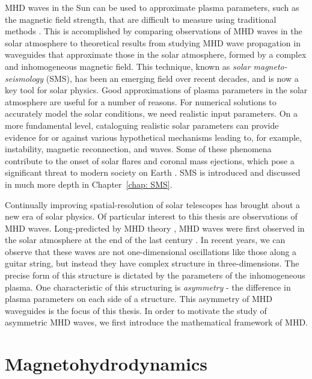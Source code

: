 MHD waves in the Sun can be used to approximate plasma parameters, such as the magnetic field strength, that are difficult to measure using traditional methods \citep{nak_etal05,dem_etal12}. This is accomplished by comparing observations of MHD waves in the solar atmosphere to theoretical results from studying MHD wave propagation in waveguides that approximate those in the solar atmosphere, formed by a complex and inhomogeneous magnetic field. This technique, known as \textit{solar magneto-seismology} (SMS), has been an emerging field over recent decades, and is now a key tool for solar physics. Good approximations of plasma parameters in the solar atmosphere are useful for a number of reasons. For numerical solutions to accurately model the solar conditions, we need realistic input parameters. On a more fundamental level, cataloguing realistic solar parameters can provide evidence for or against various hypothetical mechanisms leading to, for example, instability, magnetic reconnection, and waves. Some of these phenomena contribute to the onset of solar flares and coronal mass ejections, which pose a significant threat to modern society on Earth \citep{cab15}. SMS is introduced and discussed in much more depth in Chapter~\ref{chap: SMS}.

Continually improving spatial-resolution of solar telescopes has brought about a new era of solar physics. Of particular interest to this thesis are observations of MHD waves. Long-predicted by MHD theory \cite{rob00}, MHD waves were first observed in the solar atmosphere at the end of the last century \citep{asc_etal99, nak_etal99}. In recent years, we can observe that these waves are not one-dimensional oscillations like those along a guitar string, but instead they have complex structure in three-dimensions. The precise form of this structure is dictated by the parameters of the inhomogeneous plasma. One characteristic of this structuring is \textit{asymmetry} - the difference in plasma parameters on each side of a structure. This asymmetry of MHD waveguides is the focus of this thesis. In order to motivate the study of asymmetric MHD waves, we first introduce the mathematical framework of MHD.


\section{Magnetohydrodynamics}
\label{sec: MHD}


